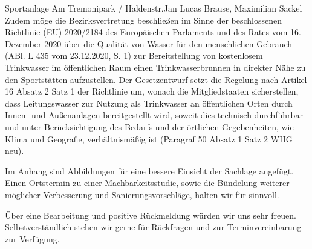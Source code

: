 \documentclass{../../templates/amendment}
\begin{document}
\begin{boxed}{Sportanlage Am Tremonipark / Haldenstr.}{Jan Lucas Brause, Maximilian Sackel}
    Zudem möge die Bezirksvertretung beschließen im Sinne der beschlossenen
    Richtlinie (EU) 2020/2184 des Europäischen Parlaments und des Rates vom 16.
    Dezember 2020 über die Qualität von Wasser für den menschlichen Gebrauch
    (ABl. L 435 vom 23.12.2020, S. 1) zur Bereitstellung von kostenlosem
    Trinkwasser im öffentlichen Raum einen Trinkwasserbrunnen in direkter Nähe
    zu den Sportstätten aufzustellen.
    Der Gesetzentwurf setzt die Regelung nach Artikel 16 Absatz 2 Satz 1 der
    Richtlinie um, wonach die Mitgliedstaaten sicherstellen, dass Leitungswasser
    zur Nutzung als Trinkwasser an öffentlichen Orten durch Innen- und Außenanlagen
    bereitgestellt wird, soweit dies technisch durchführbar und unter
    Berücksichtigung des Bedarfs und der örtlichen Gegebenheiten, wie Klima und
    Geografie, verhältnismäßig ist (Paragraf 50 Absatz 1 Satz 2 WHG neu).

    Im Anhang sind Abbildungen für eine bessere Einsicht der Sachlage angefügt.
    Einen Ortstermin zu einer Machbarkeitsstudie, sowie die Bündelung weiterer möglicher Verbesserung und Sanierungsvorschläge, halten wir für sinnvoll.

    Über eine Bearbeitung und positive Rückmeldung würden wir uns sehr freuen.
    Selbstverständlich stehen wir gerne für Rückfragen und zur Terminvereinbarung zur Verfügung.


\end{boxed}
\end{document}
